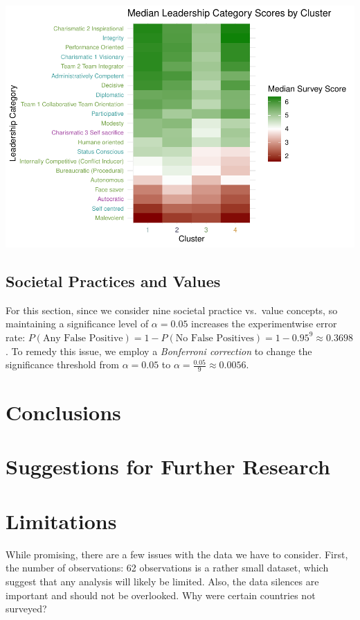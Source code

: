 \documentclass[
]{article}
\begin{document}
\begin{center}\includegraphics[width=0.85\linewidth]{final_report_files/figure-latex/unnamed-chunk-7-1} \end{center}

\hypertarget{societal-practices-and-values}{%
\subsection{Societal Practices and
Values}\label{societal-practices-and-values}}

For this section, since we consider nine societal practice vs.~value
concepts, so maintaining a significance level of \(\alpha = 0.05\)
increases the experimentwise error rate:
\(P(\text{Any False Positive}) = 1 - P(\text{No False Positives}) = 1 - 0.95^{9} \approx 0.3698\).
To remedy this issue, we employ a \emph{Bonferroni correction} to change
the significance threshold from \(\alpha = 0.05\) to
\(\alpha = \frac{0.05}{9} \approx 0.0056\).

\hypertarget{conclusions}{%
\section{Conclusions}\label{conclusions}}

\hypertarget{suggestions-for-further-research}{%
\section{Suggestions for Further
Research}\label{suggestions-for-further-research}}

\hypertarget{limitations}{%
\section{Limitations}\label{limitations}}

While promising, there are a few issues with the data we have to
consider. First, the number of observations: 62 observations is a rather
small dataset, which suggest that any analysis will likely be limited.
Also, the data silences are important and should not be overlooked. Why
were certain countries not surveyed?
\end{document}
